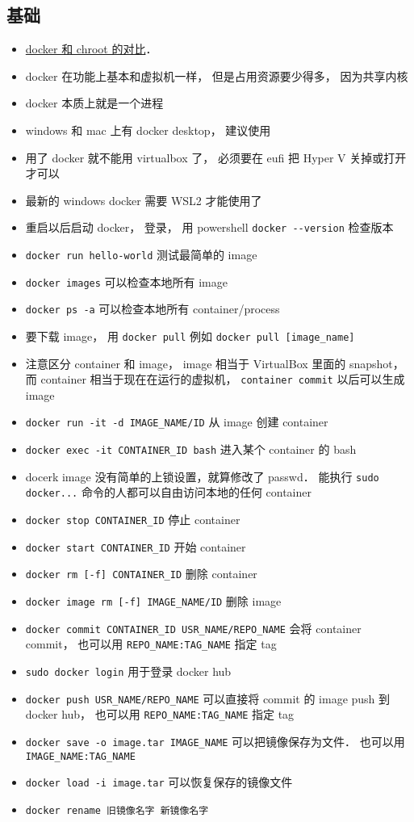 \subsection{基础}
\begin{itemize}
\item \href{https://devops.stackexchange.com/questions/2826/difference-between-chroot-and-docker}{docker 和 chroot 的对比}．
\item docker 在功能上基本和虚拟机一样， 但是占用资源要少得多， 因为共享内核
\item docker 本质上就是一个进程
\item windows 和 mac 上有 docker desktop， 建议使用
\item 用了 docker 就不能用 virtualbox 了， 必须要在 eufi 把 Hyper V 关掉或打开才可以
\item 最新的 windows docker 需要 WSL2 才能使用了
\item 重启以后启动 docker， 登录， 用 powershell \verb`docker --version` 检查版本
\item \verb`docker run hello-world` 测试最简单的 image
\item \verb`docker images` 可以检查本地所有 image
\item \verb`docker ps -a` 可以检查本地所有 container/process
\item 要下载 image， 用 \verb`docker pull` 例如 \verb`docker pull [image_name]`
\item 注意区分 container 和 image， image 相当于 VirtualBox 里面的 snapshot， 而 container 相当于现在在运行的虚拟机， \verb`container commit` 以后可以生成 image
\item \verb`docker run -it -d IMAGE_NAME/ID` 从 image 创建 container
\item \verb`docker exec -it CONTAINER_ID bash` 进入某个 container 的 bash
\item docerk image 没有简单的上锁设置，就算修改了 passwd． 能执行 \verb`sudo docker...` 命令的人都可以自由访问本地的任何 container
\item \verb`docker stop CONTAINER_ID` 停止 container
\item \verb`docker start CONTAINER_ID` 开始 container
\item \verb`docker rm [-f] CONTAINER_ID` 删除 container
\item \verb`docker image rm [-f] IMAGE_NAME/ID` 删除 image
\item \verb`docker commit CONTAINER_ID USR_NAME/REPO_NAME` 会将 container commit， 也可以用 \verb`REPO_NAME:TAG_NAME` 指定 tag
\item \verb`sudo docker login` 用于登录 docker hub
\item \verb`docker push USR_NAME/REPO_NAME` 可以直接将 commit 的 image push 到 docker hub， 也可以用 \verb`REPO_NAME:TAG_NAME` 指定 tag
\item \verb|docker save -o image.tar IMAGE_NAME| 可以把镜像保存为文件． 也可以用 \verb|IMAGE_NAME:TAG_NAME|
\item \verb|docker load -i image.tar| 可以恢复保存的镜像文件
\item \verb|docker rename 旧镜像名字 新镜像名字|
\end{itemize}

